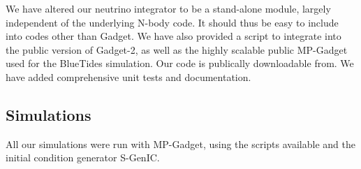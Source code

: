 \documentclass[useAMS, usenatbib]{mnras}
\begin{document}
We have altered our neutrino integrator to be a stand-alone module, largely
independent of the underlying N-body code. It should thus be easy to include
into codes other than Gadget. We have also provided a script to integrate into the
public version of Gadget-2, as well as the highly scalable public MP-Gadget
used for the BlueTides simulation. Our code is publically downloadable from.
We have added comprehensive unit tests and documentation.

\subsection{Simulations}
\label{sec:simulations}

All our simulations were run with MP-Gadget, using the scripts available
and the initial condition generator S-GenIC.
\end{document}
